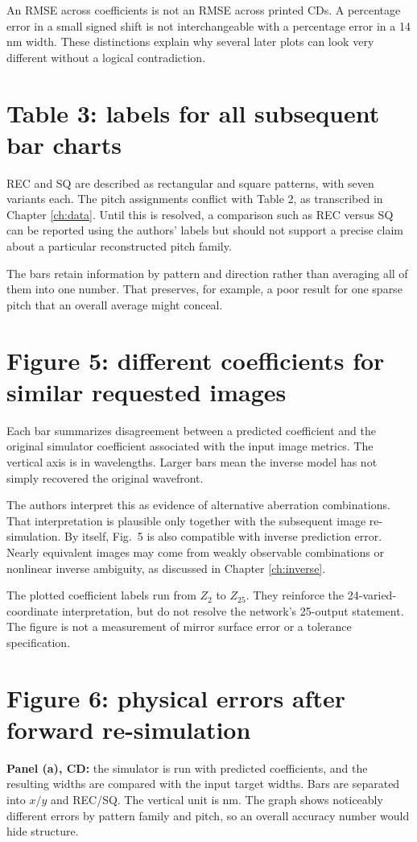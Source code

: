 An RMSE across coefficients is not an RMSE across printed CDs.
A percentage error in a small signed shift is not interchangeable
with a percentage error in a 14 nm width.
These distinctions explain why several later plots can look very different
without a logical contradiction.

\section{Table 3: labels for all subsequent bar charts}
REC and SQ are described as rectangular and square patterns, with
seven variants each. The pitch assignments conflict with Table 2,
as transcribed in Chapter \ref{ch:data}.
Until this is resolved, a comparison such as REC versus SQ can be
reported using the authors' labels but should not support a precise
claim about a particular reconstructed pitch family.

The bars retain information by pattern and direction rather than averaging
all of them into one number. That preserves, for example, a poor result
for one sparse pitch that an overall average might conceal.

\section{Figure 5: different coefficients for similar requested images}
Each bar summarizes disagreement between a predicted coefficient and
the original simulator coefficient associated with the input image metrics.
The vertical axis is in wavelengths. Larger bars mean the inverse model
has not simply recovered the original wavefront.

The authors interpret this as evidence of alternative aberration
combinations. That interpretation is plausible only together with the
subsequent image re-simulation. By itself, Fig.~5 is also compatible
with inverse prediction error.
Nearly equivalent images may come from weakly observable combinations
or nonlinear inverse ambiguity, as discussed in Chapter \ref{ch:inverse}.

The plotted coefficient labels run from $Z_2$ to $Z_{25}$.
They reinforce the 24-varied-coordinate interpretation, but do not
resolve the network's 25-output statement.
The figure is not a measurement of mirror surface error or a tolerance
specification.

\section{Figure 6: physical errors after forward re-simulation}
\textbf{Panel (a), CD:} the simulator is run with predicted coefficients,
and the resulting widths are compared with the input target widths.
Bars are separated into $x/y$ and REC/SQ. The vertical unit is nm.
The graph shows noticeably different errors by pattern family and pitch,
so an overall accuracy number would hide structure.

